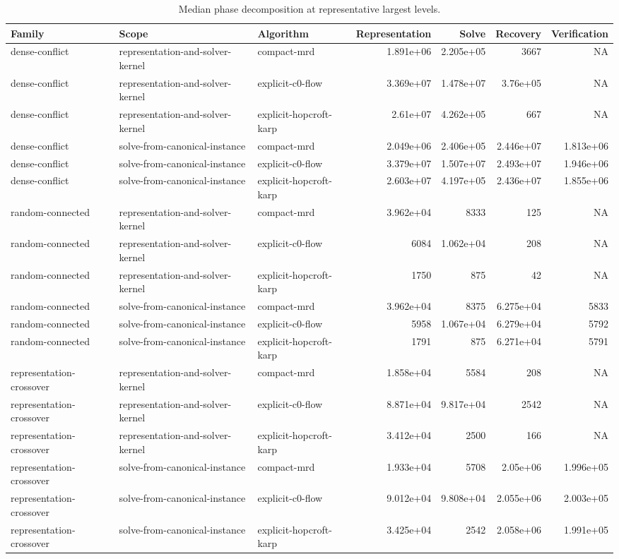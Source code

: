 \begin{table}[t]
\caption{Median phase decomposition at representative largest levels.}
\label{tab:kernel-phases}
\begin{tabular}{lllrrrr}
\toprule
Family & Scope & Algorithm & Representation & Solve & Recovery & Verification \\
\midrule
dense-conflict & representation-and-solver-kernel & compact-mrd & 1.891e+06 & 2.205e+05 & 3667 & NA \\
dense-conflict & representation-and-solver-kernel & explicit-c0-flow & 3.369e+07 & 1.478e+07 & 3.76e+05 & NA \\
dense-conflict & representation-and-solver-kernel & explicit-hopcroft-karp & 2.61e+07 & 4.262e+05 & 667 & NA \\
dense-conflict & solve-from-canonical-instance & compact-mrd & 2.049e+06 & 2.406e+05 & 2.446e+07 & 1.813e+06 \\
dense-conflict & solve-from-canonical-instance & explicit-c0-flow & 3.379e+07 & 1.507e+07 & 2.493e+07 & 1.946e+06 \\
dense-conflict & solve-from-canonical-instance & explicit-hopcroft-karp & 2.603e+07 & 4.197e+05 & 2.436e+07 & 1.855e+06 \\
random-connected & representation-and-solver-kernel & compact-mrd & 3.962e+04 & 8333 & 125 & NA \\
random-connected & representation-and-solver-kernel & explicit-c0-flow & 6084 & 1.062e+04 & 208 & NA \\
random-connected & representation-and-solver-kernel & explicit-hopcroft-karp & 1750 & 875 & 42 & NA \\
random-connected & solve-from-canonical-instance & compact-mrd & 3.962e+04 & 8375 & 6.275e+04 & 5833 \\
random-connected & solve-from-canonical-instance & explicit-c0-flow & 5958 & 1.067e+04 & 6.279e+04 & 5792 \\
random-connected & solve-from-canonical-instance & explicit-hopcroft-karp & 1791 & 875 & 6.271e+04 & 5791 \\
representation-crossover & representation-and-solver-kernel & compact-mrd & 1.858e+04 & 5584 & 208 & NA \\
representation-crossover & representation-and-solver-kernel & explicit-c0-flow & 8.871e+04 & 9.817e+04 & 2542 & NA \\
representation-crossover & representation-and-solver-kernel & explicit-hopcroft-karp & 3.412e+04 & 2500 & 166 & NA \\
representation-crossover & solve-from-canonical-instance & compact-mrd & 1.933e+04 & 5708 & 2.05e+06 & 1.996e+05 \\
representation-crossover & solve-from-canonical-instance & explicit-c0-flow & 9.012e+04 & 9.808e+04 & 2.055e+06 & 2.003e+05 \\
representation-crossover & solve-from-canonical-instance & explicit-hopcroft-karp & 3.425e+04 & 2542 & 2.058e+06 & 1.991e+05 \\
\bottomrule
\end{tabular}
\end{table}

